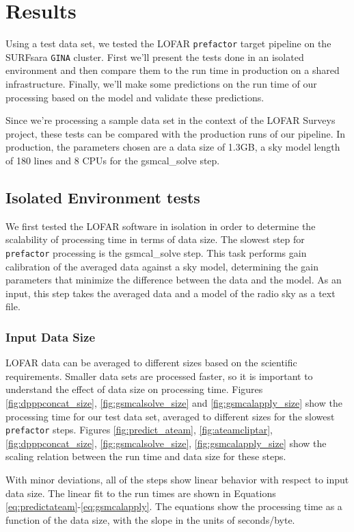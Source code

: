 \documentclass[preprint,5p]{elsarticle}
\begin{document}
\section{Results}\label{sec:results}

Using a test data set, we tested the LOFAR \texttt{prefactor} target pipeline on the SURFsara \texttt{GINA} cluster. First we'll present the tests done in an isolated environment and then compare them to the run time in production on a shared infrastructure. Finally, we'll make some predictions on the run time of our processing based on the model and validate these predictions. 

Since we're processing a sample data set in the context of the LOFAR Surveys project, these tests can be compared with the production runs of our pipeline. In production, the parameters chosen are a data size of 1.3GB, a sky model length of 180 lines and 8 CPUs for the gsmcal\_solve step. 


\subsection{Isolated Environment tests}
We first tested the LOFAR software in isolation in order to determine the scalability of processing time in terms of data size. The slowest step for \texttt{prefactor} processing is the gsmcal\_solve step. This task performs gain calibration of the averaged data against a sky model, determining the gain parameters that minimize the difference between the data and the model. As an input, this step takes the averaged data and a model of the radio sky as a text file. 

\subsubsection{Input Data Size}\label{sec:results_size}
LOFAR data can be averaged to different sizes based on the scientific requirements. Smaller data sets are processed faster, so it is important to understand the effect of data size on processing time. Figures \ref{fig:dpppconcat_size}, \ref{fig:gsmcalsolve_size} and \ref{fig:gsmcalapply_size}  show the processing time for our test data set, averaged to different sizes for the slowest \texttt{prefactor} steps. Figures \ref{fig:predict_ateam}, \ref{fig:ateamcliptar}, \ref{fig:dpppconcat_size}, \ref{fig:gsmcalsolve_size}, \ref{fig:gsmcalapply_size} show the scaling relation between the run time and data size for these steps. 

With minor deviations, all of the steps show linear behavior with respect to input data size. The linear fit to the run times are shown in Equations \ref{eq:predictateam}-\ref{eq:gsmcalapply}. The equations show the processing time as a function of the data size, with the slope in the units of seconds/byte.
\end{document}
